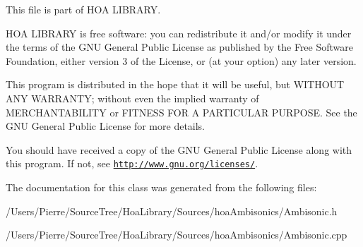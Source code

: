 This file is part of H\-O\-A L\-I\-B\-R\-A\-R\-Y.

H\-O\-A L\-I\-B\-R\-A\-R\-Y is free software\-: you can redistribute it and/or modify it under the terms of the G\-N\-U General Public License as published by the Free Software Foundation, either version 3 of the License, or (at your option) any later version.

This program is distributed in the hope that it will be useful, but W\-I\-T\-H\-O\-U\-T A\-N\-Y W\-A\-R\-R\-A\-N\-T\-Y; without even the implied warranty of M\-E\-R\-C\-H\-A\-N\-T\-A\-B\-I\-L\-I\-T\-Y or F\-I\-T\-N\-E\-S\-S F\-O\-R A P\-A\-R\-T\-I\-C\-U\-L\-A\-R P\-U\-R\-P\-O\-S\-E. See the G\-N\-U General Public License for more details.

You should have received a copy of the G\-N\-U General Public License along with this program. If not, see \href{http://www.gnu.org/licenses/}{\tt http\-://www.\-gnu.\-org/licenses/}. 

The documentation for this class was generated from the following files\-:\begin{DoxyCompactItemize}
\item 
/\-Users/\-Pierre/\-Source\-Tree/\-Hoa\-Library/\-Sources/hoa\-Ambisonics/Ambisonic.\-h\item 
/\-Users/\-Pierre/\-Source\-Tree/\-Hoa\-Library/\-Sources/hoa\-Ambisonics/Ambisonic.\-cpp\end{DoxyCompactItemize}
